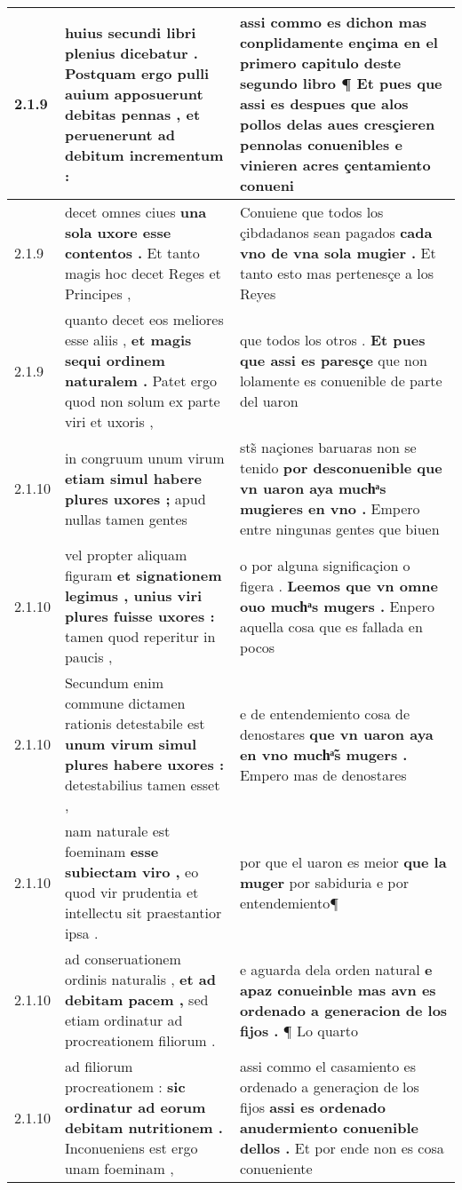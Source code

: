 \begin{tabular}{|p{1cm}|p{6.5cm}|p{6.5cm}|}
2.1.9 & huius secundi libri plenius dicebatur . \textbf{ Postquam ergo pulli auium apposuerunt debitas pennas , } et peruenerunt ad debitum incrementum : & assi commo es dichon mas conplidamente ençima en el primero capitulo deste segundo libro ¶ \textbf{ Et pues que assi es despues que alos pollos delas aues cresçieren pennolas conuenibles } e vinieren acres çentamiento conueni \\\hline
2.1.9 & decet omnes ciues \textbf{ una sola uxore esse contentos . } Et tanto magis hoc decet Reges et Principes , & Conuiene que todos los çibdadanos sean pagados \textbf{ cada vno de vna sola mugier . } Et tanto esto mas pertenesçe a los Reyes \\\hline
2.1.9 & quanto decet eos meliores esse aliis , \textbf{ et magis sequi ordinem naturalem . } Patet ergo quod non solum ex parte viri et uxoris , & que todos los otros . \textbf{ Et pues que assi es paresçe } que non lolamente es conuenible de parte del uaron \\\hline
2.1.10 & in congruum unum virum \textbf{ etiam simul habere plures uxores ; } apud nullas tamen gentes & sts̃ naçiones baruaras non se tenido \textbf{ por desconuenible que vn uaron aya muchͣs mugieres en vno . } Empero entre ningunas gentes que biuen \\\hline
2.1.10 & vel propter aliquam figuram \textbf{ et signationem legimus , unius viri plures fuisse uxores : } tamen quod reperitur in paucis , & o por alguna significaçion o figera . \textbf{ Leemos que vn omne ouo muchͣs mugers . } Enpero aquella cosa que es fallada en pocos \\\hline
2.1.10 & Secundum enim commune dictamen rationis detestabile est \textbf{ unum virum simul plures habere uxores : } detestabilius tamen esset , & e de entendemiento cosa de denostares \textbf{ que vn uaron aya en vno muchͣ̃s mugers . } Empero mas de denostares \\\hline
2.1.10 & nam naturale est foeminam \textbf{ esse subiectam viro , } eo quod vir prudentia et intellectu sit praestantior ipsa . & por que el uaron es meior \textbf{ que la muger } por sabiduria e por entendemiento¶ \\\hline
2.1.10 & ad conseruationem ordinis naturalis , \textbf{ et ad debitam pacem , } sed etiam ordinatur ad procreationem filiorum . & e aguarda dela orden natural \textbf{ e apaz conueinble mas avn es ordenado a generacion de los fijos . } ¶ Lo quarto \\\hline
2.1.10 & ad filiorum procreationem : \textbf{ sic ordinatur ad eorum debitam nutritionem . } Inconueniens est ergo unam foeminam , & assi commo el casamiento es ordenado a generaçion de los fijos \textbf{ assi es ordenado anudermiento conuenible dellos . } Et por ende non es cosa conueniente \\\hline

\end{tabular}
